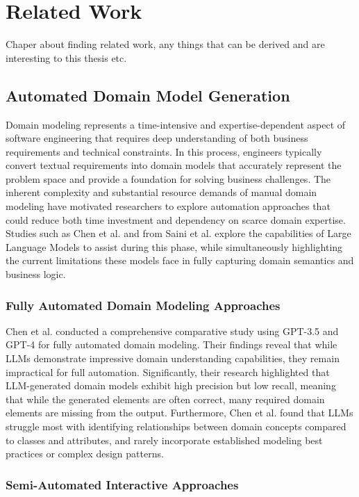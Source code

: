 \chapter{Related Work}\label{chapter:relatedwork}
Chaper about finding related work, any things that can be derived and are interesting to this thesis etc.
\section{Automated Domain Model Generation}\label{admg}
Domain modeling represents a time-intensive and expertise-dependent aspect of software engineering that requires deep understanding of both business requirements and technical constraints. In this process, engineers typically convert textual requirements into domain models that accurately represent the problem space and provide a foundation for solving business challenges. The inherent complexity and substantial resource demands of manual domain modeling have motivated researchers to explore automation approaches that could reduce both time investment and dependency on scarce domain expertise. Studies such as Chen et al. \autocite{chen2023automated} and from Saini et al. \autocite{Saini2022} explore the capabilities of Large Language Models to assist during this phase, while simultaneously highlighting the current limitations these models face in fully capturing domain semantics and business logic. 

\subsection{Fully Automated Domain Modeling Approaches}

Chen et al. \autocite{chen2023automated} conducted a comprehensive comparative study using GPT-3.5 and GPT-4 for fully automated domain modeling. Their findings reveal that while LLMs demonstrate impressive domain understanding capabilities, they remain impractical for full automation. Significantly, their research highlighted that LLM-generated domain models exhibit high precision but low recall, meaning that while the generated elements are often correct, many required domain elements are missing from the output. Furthermore, Chen et al. found that LLMs struggle most with identifying relationships between domain concepts compared to classes and attributes, and rarely incorporate established modeling best practices or complex design patterns.

\subsection{Semi-Automated Interactive Approaches}

